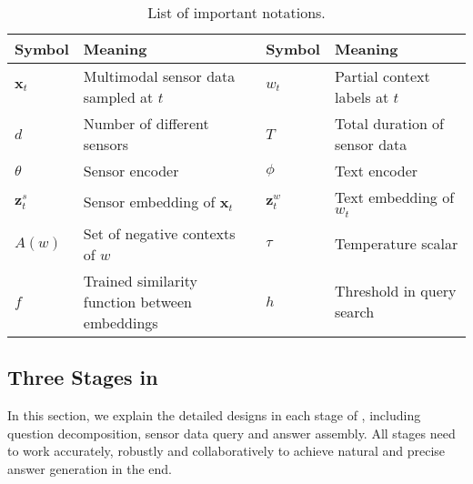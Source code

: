 \begin{table}[t]
\small
\caption{List of important notations.}
\label{tbl:notation}
\vspace{-4mm}
\begin{center}
\begin{tabular}{p{3em} p{21em} | p{3em} p{21em} } 
\toprule
Symbol & Meaning & Symbol & Meaning \\
\midrule
 $\mathbf{x}_t$ & Multimodal sensor data sampled at $t$ &
 $w_t$ & Partial context labels at $t$ \\
 $d$ & Number of different sensors &
 $T$ & Total duration of sensor data \\
 $\theta$ & Sensor encoder &
 $\phi$ & Text encoder \\
 $\mathbf{z}^s_t$ & Sensor embedding of $\mathbf{x}_t$ &
 $\mathbf{z}^w_t$ & Text embedding of $w_t$ \\
 $A(w)$ & Set of negative contexts of $w$ &
 $\tau$ & Temperature scalar \\
 $f$ & Trained similarity function between embeddings & 
 $h$ & Threshold in query search \\
\bottomrule
\end{tabular}
\end{center}
\vspace{-4mm}
\end{table}


\subsection{Three Stages in \Method}
\label{sec:three-stage}

In this section, we explain the detailed designs in each stage of \Method, including question decomposition, sensor data query and answer assembly.
All stages need to work accurately, robustly and collaboratively to achieve natural and precise answer generation in the end.


